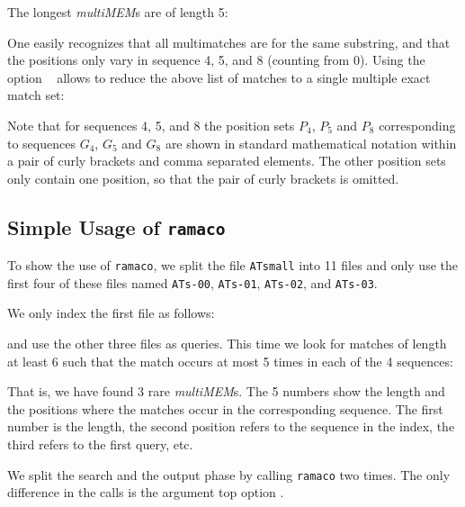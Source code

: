 \documentclass[12pt]{article}
\newcommand{\SEMM}{\texttt{ramaco}\xspace}
\newcommand{\MMEM}[0]{\textit{multiMEM}\xspace}
\newcommand{\EXECUTE}[1]{}
\begin{document}
The longest \MMEM{s} are of length 5:

\EXECUTE{multimat -l 5 ATsmall}

One easily recognizes that all multimatches are for the
same substring, and that the positions only vary in
sequence 4, 5, and 8 (counting from 0). Using the option
~ allows to
reduce the above list of matches to a single multiple exact match set:

\EXECUTE{multimat -s -l 5 -algorithm memset ATsmall}

Note that for sequences 4, 5, and 8 the position sets \(P_{4}\),
\(P_{5}\) and \(P_{8}\) corresponding to sequences \(G_{4}\),
\(G_{5}\) and \(G_{8}\) are shown in standard mathematical notation
within a pair of curly brackets and comma separated elements. 
The other position sets only contain one position, so that the pair of
curly brackets is omitted.

\subsection{Simple Usage of \SEMM}

To show the use of \SEMM, we split the file \texttt{ATsmall} into 11 files 
and only use the first four of these files named
\texttt{\small ATs-00}, 
\texttt{\small ATs-01},
\texttt{\small ATs-02}, and
\texttt{\small ATs-03}.

We only index the first file as follows:

\EXECUTE{mkvtree -indexname ATS -dna -tis -sti1 -bck -suf -lcp -pl -v -db ATs-00}

and use the other three files as queries. This time we look for 
matches of length at least 6 such that the match occurs at most
5 times in each of the 4 sequences:

\EXECUTE{ramaco -l 6 -rare 5 ATS ATs-01 ATs-02 ATs-03}

That is, we have found 3 rare \MMEM{s}. The 5 numbers show the length
and the positions where the matches occur in the corresponding sequence. 
The first number is the length, the second position
refers to the sequence in the index, the third refers to the
first query, etc.

We split the search and the output phase by calling 
\SEMM two times. The only difference in the calls is 
the argument top option .

\EXECUTE{ramaco -v -phase search -l 6 -rare 5 ATS ATs-01 ATs-02 ATs-03}
\end{document}
